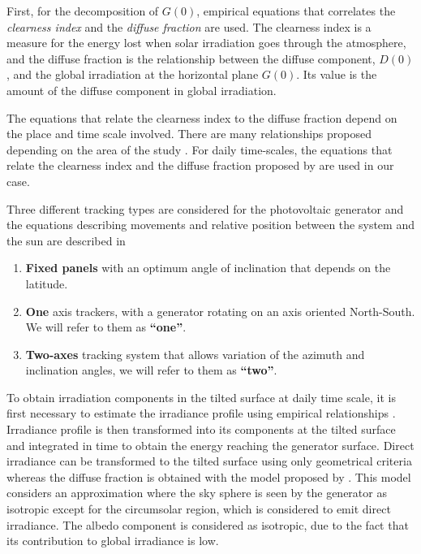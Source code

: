 First, for the decomposition of $G(0)$, empirical equations that correlates the \textit{clearness index} and the \textit{diffuse fraction} \cite*{Page1961} are used. The clearness index is a measure for the energy lost when solar irradiation goes through the atmosphere, and the diffuse fraction is the relationship between the diffuse component, $D(0)$, and the global irradiation at the horizontal plane $G(0)$. Its value is the amount of the diffuse component in global irradiation.

The equations that relate the clearness index to the diffuse fraction depend on the place and time scale involved. There are many relationships proposed depending on the area of the study \cite*{deMiguel2001, Gopinathan1995}. For daily time-scales, the equations that relate the clearness index and the diffuse fraction proposed by \cite{Aguiar1992} are used in our case. 

Three different tracking types are considered for the photovoltaic generator and the equations describing movements and relative position between the system and the sun are described in \cite{Perpinan2009}
\begin{enumerate}
\item \textbf{Fixed panels} with an optimum angle of inclination that depends on the latitude.
\item \textbf{One} axis trackers, with a generator rotating on an axis oriented North-South. We will refer to them as \textbf{“one”}.
\item \textbf{Two-axes} tracking system that allows variation of the azimuth and inclination angles, we will refer to them as \textbf{“two”}.
\end{enumerate}

To obtain irradiation components in the tilted surface at daily time scale, it is first necessary to estimate the irradiance profile using empirical relationships \cite*{Collares-Pereira1979}. Irradiance profile is then transformed into its components at the tilted surface and integrated in time to obtain the energy reaching the generator surface. Direct irradiance can be transformed to the tilted surface using only geometrical criteria whereas the diffuse fraction is obtained with the model proposed by \cite{hay1985estimating}. This model considers an approximation where the sky sphere is seen by the generator as isotropic except for the circumsolar region, which is considered to emit direct irradiance. The albedo component is considered as isotropic, due to the fact that its contribution to global irradiance is low. 

